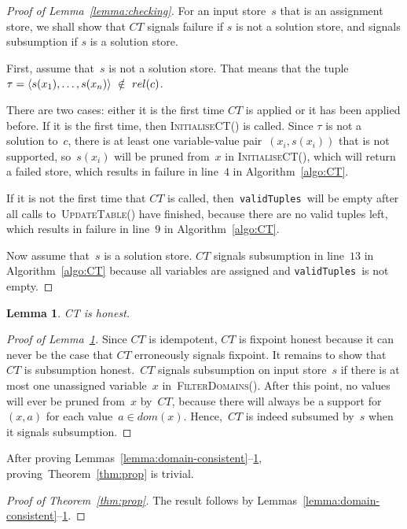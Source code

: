 \documentclass[a4paper,11pt]{article}
\newtheorem{lemma}[theorem]{Lemma}
\newcommand{\Algoref}[1]{Algorithm~\ref{#1}}
\newcommand{\Thmref}[1]{Theorem~\ref{#1}}
\newcommand{\Lemmaref}[1]{Lemma~\ref{#1}}
\newcommand{\CurrTable}{\texttt{validTuples}}
\def\UpdateTable{\textsc{UpdateTable}}
\def\FilterDomains{\textsc{FilterDomains}}
\def\InitialiseCT{\textsc{InitialiseCT}}
\numberwithin{equation}{section}
\begin{document}
\begin{proof}[Proof of \Lemmaref{lemma:checking}]
  For an input store~$s$ that is an assignment store, we shall show that $CT$
  signals failure if $s$ is not a solution store, and signals subsumption if
  $s$ is a solution store. 

  First, assume that~$s$ is not a solution store. That means that the tuple
  $\tau = \left\langle s(x_1),\ldots,s(x_n)\right\rangle~\notin~rel(c)$.
 
  There are two cases: either
  it is the first time $CT$ is applied or it has been applied before.
  If it is the first time, then \InitialiseCT() is called.
  Since $\tau$ is not a solution to~$c$, there is at least one variable-value
  pair~$(x_i,s(x_i))$ that is not supported, so~$s(x_i)$ will be pruned
  from~$x$ in \InitialiseCT(), which will return a failed store, which results
  in failure in line~$4$ in \Algoref{algo:CT}.

  If it is not the first time that $CT$ is called, then~\CurrTable~will be empty
  after all calls to~\UpdateTable() have finished, because there are no
  valid tuples left, which results in failure in line~$9$ in \Algoref{algo:CT}.
  
  Now assume that~$s$ is a solution store. 
  $CT$ signals subsumption in line~$13$ in \Algoref{algo:CT} because all
  variables are assigned and \CurrTable~is not empty.
\end{proof}

\begin{lemma}\label{lemma:honest}
  CT is honest.
\end{lemma}

\begin{proof}[Proof of \Lemmaref{lemma:honest}]
  Since $CT$ is idempotent, $CT$ is fixpoint honest because it can never be the
  case that $CT$ erroneously signals fixpoint.
  It remains to show that
  $CT$ is subsumption honest.~$CT$ signals subsumption on input store~$s$
  if there is at most one
  unassigned variable~$x$ in~\FilterDomains(). After this point, no values will
  ever be pruned from~$x$ by~$CT$, because there will always be a support for
  $(x,a)$ for each value~$a \in dom(x)$. Hence,~$CT$ is indeed subsumed by~$s$
  when it signals subsumption.
\end{proof}

After proving Lemmas~\ref{lemma:domain-consistent}--\ref{lemma:honest},
proving~\Thmref{thm:prop} is trivial.

\begin{proof}[Proof of \Thmref{thm:prop}]
  The result follows by Lemmas~\ref{lemma:domain-consistent}--\ref{lemma:honest}.
\end{proof}
\end{document}
